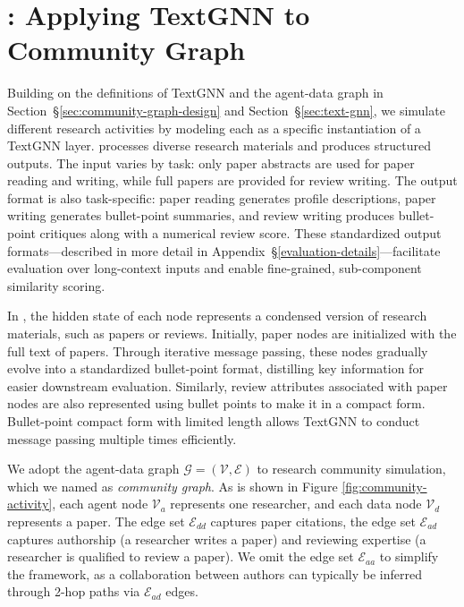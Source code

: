 \section{\envname: Applying TextGNN to Community Graph}
\label{sec:method}


 Building on the definitions of TextGNN and the agent-data graph in Section~\S\ref{sec:community-graph-design} and Section~\S\ref{sec:text-gnn}, we simulate different research activities by modeling each as a specific instantiation of a TextGNN layer. \envname processes diverse research materials and produces structured outputs. The input varies by task: only paper abstracts are used for paper reading and writing, while full papers are provided for review writing. The output format is also task-specific: paper reading generates profile descriptions, paper writing generates bullet-point summaries, and review writing produces bullet-point critiques along with a numerical review score. These standardized output formats—described in more detail in Appendix~\S\ref{evaluation-details}—facilitate evaluation over long-context inputs and enable fine-grained, sub-component similarity scoring.

 In \envname, the hidden state of each node represents a condensed version of research materials, such as papers or reviews. Initially, paper nodes are initialized with the full text of papers. Through iterative message passing, these nodes gradually evolve into a standardized bullet-point format, distilling key information for easier downstream evaluation. Similarly, review attributes associated with paper nodes are also represented using bullet points to make it in a compact form. Bullet-point compact form with limited length allows TextGNN to conduct message passing multiple times efficiently.


We adopt the agent-data graph $\mathcal{G} = (\mathcal{V}, \mathcal{E})$ to research community simulation, which we named as \textit{community graph}. As is shown in Figure \ref{fig:community-activity}, each agent node $\mathcal{V}_a$ represents one researcher, and each data node $\mathcal{V}_d$ represents a paper. The edge set $ \mathcal{E}_{dd}$ captures paper citations, the edge set $\mathcal{E}_{ad}$ captures authorship (a researcher writes a paper) and reviewing expertise (a researcher is qualified to review a paper). We omit the edge set $ \mathcal{E}_{aa}$ to simplify the framework, as a collaboration between authors can typically be inferred through 2-hop paths via $\mathcal{E}_{ad}$ edges.


